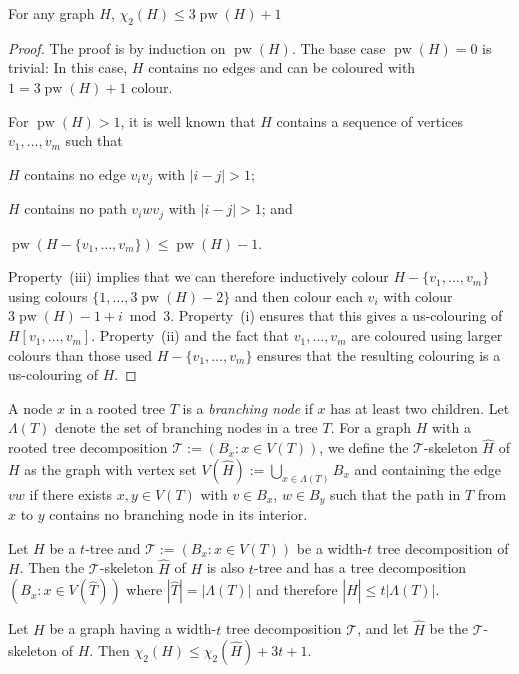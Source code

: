 \documentclass[kpfonts]{patmorin}
\DeclareMathOperator{\pw}{pw}
\newcommand{\uqs}{\chi_2}
\theoremstyle{named}
\begin{document}
\begin{lem}\label{pathwidth}
    For any graph $H$, $\uqs(H)\le 3\pw(H) + 1$
\end{lem}

\begin{proof}
    The proof is by induction on $\pw(H)$.  The base case $\pw(H)=0$ is trivial: In this case, $H$ contains no edges and can be coloured with $1 = 3\pw(H)+1$ colour.

    For $\pw(H)>1$, it is well known that $H$ contains a sequence of vertices $v_1,\ldots,v_m$  such that
    \begin{inparaenum}[(i)]
        \item $H$ contains no edge $v_iv_j$ with $|i-j|>1$;
        \item $H$ contains no path $v_iw v_j$ with $|i-j|>1$; and
        \item $\pw(H-\{v_1,\ldots,v_m\})\le \pw(H)-1$.
    \end{inparaenum}
    Property~(iii) implies that we can therefore inductively colour $H-\{v_1,\ldots,v_m\}$ using colours $\{1,\ldots,3\pw(H)-2\}$ and then colour each $v_i$ with colour $3\pw(H)-1+i\bmod 3$.  Property~(i) ensures that this gives a us-colouring of $H[v_1,\ldots,v_m]$.  Property~(ii) and the fact that $v_1,\ldots,v_m$ are coloured using larger colours than those used $H-\{v_1,\ldots,v_m\}$ ensures that the resulting colouring is a us-colouring of $H$.
\end{proof}

A node $x$ in a rooted tree $T$ is a \emph{branching node} if $x$ has at least two children.  Let $\Lambda(T)$ denote the set of branching nodes in a tree $T$. For a graph $H$ with a rooted tree decomposition $\mathcal{T}:=(B_x:x\in V(T))$, we define the $\mathcal{T}$-skeleton $\hat{H}$ of $H$ as the graph with vertex set $V(\hat{H}):=\bigcup_{x\in \Lambda(T)} B_x$ and containing the edge $vw$ if there exists $x,y\in V(T)$ with $v\in B_x$, $w\in B_y$ such that the path in $T$ from $x$ to $y$ contains no branching node in its interior.

\begin{obs}\label{skeleton-size}
    Let $H$ be a $t$-tree and $\mathcal{T}:=(B_x:x\in V(T))$ be a width-$t$ tree decomposition of $H$.  Then the $\mathcal{T}$-skeleton $\hat{H}$ of $H$ is also $t$-tree and has a tree decomposition $(B_x:x\in V(\hat{T}))$ where $|\hat{T}|=|\Lambda(T)|$ and therefore $|\hat{H}|\le t|\Lambda(T)|$.
\end{obs}

\begin{lem}\label{skeleton-colour}
    Let $H$ be a graph having a width-$t$ tree decomposition $\mathcal{T}$, and let $\hat{H}$ be the $\mathcal{T}$-skeleton of $H$.  Then $\uqs(H)\le \uqs(\hat{H}) + 3t+1$.
\end{lem}
\end{document}
